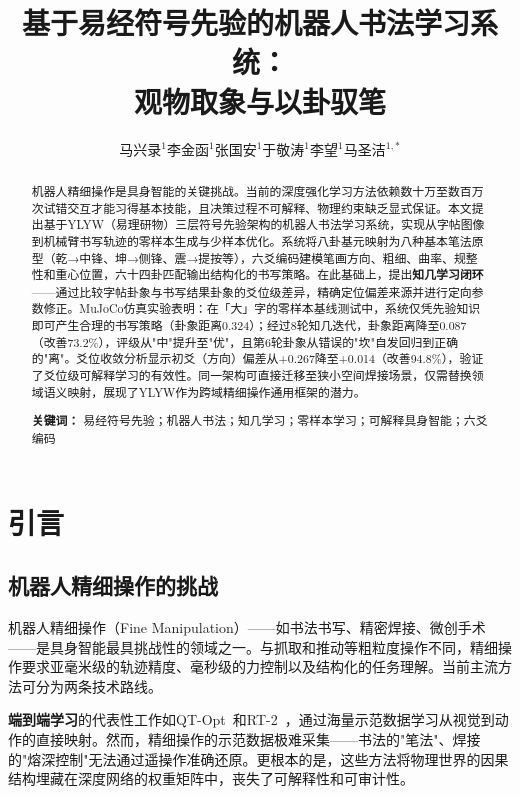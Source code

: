 \documentclass[12pt,a4paper]{article}
\title{\textbf{基于易经符号先验的机器人书法学习系统：\\观物取象与以卦驭笔}}
\author{
    马兴录$^{1}$\quad 李金函$^{1}$\quad 张国安$^{1}$\quad 于敬涛$^{1}$\quad 李望$^{1}$\quad 马圣洁$^{1,*}$
}
\date{}
\begin{document}
\maketitle

\begin{abstract}
机器人精细操作是具身智能的关键挑战。当前的深度强化学习方法依赖数十万至数百万次试错交互才能习得基本技能，且决策过程不可解释、物理约束缺乏显式保证。本文提出基于YLYW（易理研物）三层符号先验架构的机器人书法学习系统，实现从字帖图像到机械臂书写轨迹的零样本生成与少样本优化。系统将八卦基元映射为八种基本笔法原型（乾→中锋、坤→侧锋、震→提按等），六爻编码建模笔画方向、粗细、曲率、规整性和重心位置，六十四卦匹配输出结构化的书写策略。在此基础上，提出\textbf{知几学习闭环}——通过比较字帖卦象与书写结果卦象的爻位级差异，精确定位偏差来源并进行定向参数修正。MuJoCo仿真实验表明：在「大」字的零样本基线测试中，系统仅凭先验知识即可产生合理的书写策略（卦象距离0.324）；经过8轮知几迭代，卦象距离降至0.087（改善73.2\%），评级从"中"提升至"优"，且第6轮卦象从错误的"坎"自发回归到正确的"离"。爻位收敛分析显示初爻（方向）偏差从+0.267降至+0.014（改善94.8\%），验证了爻位级可解释学习的有效性。同一架构可直接迁移至狭小空间焊接场景，仅需替换领域语义映射，展现了YLYW作为跨域精细操作通用框架的潜力。

\textbf{关键词：} 易经符号先验；机器人书法；知几学习；零样本学习；可解释具身智能；六爻编码
\end{abstract}

\section{引言}

\subsection{机器人精细操作的挑战}

机器人精细操作（Fine Manipulation）——如书法书写、精密焊接、微创手术——是具身智能最具挑战性的领域之一。与抓取和推动等粗粒度操作不同，精细操作要求亚毫米级的轨迹精度、毫秒级的力控制以及结构化的任务理解。当前主流方法可分为两条技术路线。

\textbf{端到端学习}的代表性工作如QT-Opt~\cite{kalashnikov2018qt}和RT-2~\cite{brohan2023rt2}，通过海量示范数据学习从视觉到动作的直接映射。然而，精细操作的示范数据极难采集——书法的"笔法"、焊接的"熔深控制"无法通过遥操作准确还原。更根本的是，这些方法将物理世界的因果结构埋藏在深度网络的权重矩阵中，丧失了可解释性和可审计性。
\end{document}

